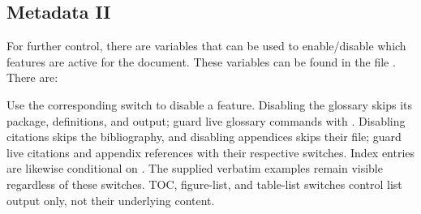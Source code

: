 
\newpage
\subsection{Metadata II}\label{subsec:Metadata-II}

For further control, there are variables that can be used to enable/disable
which features are active for the document. These variables can be found
in the file . There are:

Use the corresponding  switch to disable a feature.
Disabling the glossary skips its package, definitions, and output; guard live
glossary commands with .
Disabling citations skips the bibliography, and disabling appendices skips
their file; guard live citations and appendix references with their respective
switches. Index entries are likewise conditional on
. The supplied verbatim examples
remain visible regardless of these switches. TOC, figure-list, and table-list
switches control list output only, not their underlying content.

